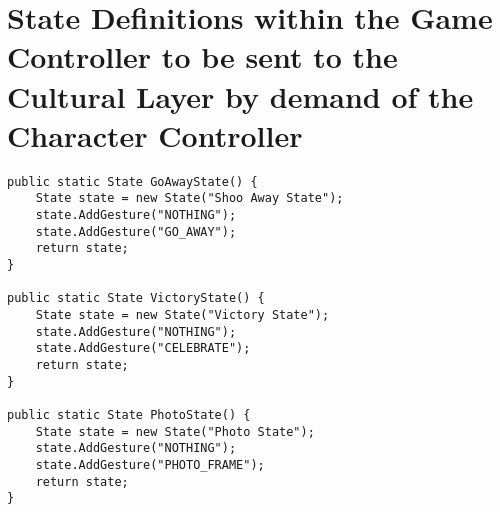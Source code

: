 \section{State Definitions within the Game Controller to be sent to the Cultural Layer by demand of the Character Controller} \label{ap1:StateDefinitions}

\begin{lstlisting}
public static State GoAwayState() {
	State state = new State("Shoo Away State");
	state.AddGesture("NOTHING");
	state.AddGesture("GO_AWAY");
	return state;
}

public static State VictoryState() {
	State state = new State("Victory State");
	state.AddGesture("NOTHING");
	state.AddGesture("CELEBRATE");
	return state;
}

public static State PhotoState() {
	State state = new State("Photo State");
	state.AddGesture("NOTHING");
	state.AddGesture("PHOTO_FRAME");
	return state;
}
\end{lstlisting}